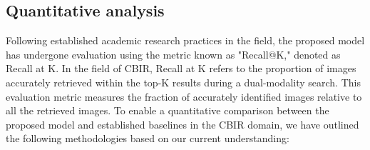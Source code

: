 \documentclass[10pt,lineno]{wlpeerj}
\begin{document}
\subsection*{Quantitative analysis}
Following established academic research practices in the field, the proposed model has undergone evaluation using the metric known as "Recall@K," denoted as Recall at K. In the field of CBIR, Recall at K refers to the proportion of images accurately retrieved within the top-K results during a dual-modality search. This evaluation metric measures the fraction of accurately identified images relative to all the retrieved images. To enable a quantitative comparison between the proposed model and established baselines in the CBIR domain, we have outlined the following methodologies based on our current understanding:

\begin{itemize}
   

\end{itemize}
\end{document}
